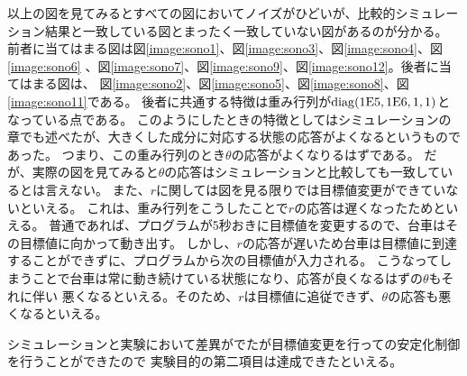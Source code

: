	以上の図を見てみるとすべての図においてノイズがひどいが、比較的シミュレーション結果と一致している図とまったく一致していない図があるのが分かる。
	前者に当てはまる図は図\ref{image:sono1}、図\ref{image:sono3}、図\ref{image:sono4}、図\ref{image:sono6}
	、図\ref{image:sono7}、図\ref{image:sono9}、図\ref{image:sono12}。後者に当てはまる図は、
	図\ref{image:sono2}、図\ref{image:sono5}、図\ref{image:sono8}、図\ref{image:sono11}である。
	後者に共通する特徴は重み行列が$\rm{diag}(1E5,1E6,1,1)$となっている点である。
	このようにしたときの特徴としてはシミュレーションの章でも述べたが、大きくした成分に対応する状態の応答がよくなるというものであった。
	つまり、この重み行列のとき$\theta$の応答がよくなりるはずである。
	だが、実際の図を見てみると$\theta$の応答はシミュレーションと比較しても一致しているとは言えない。
	また、$r$に関しては図を見る限りでは目標値変更ができていないといえる。
	これは、重み行列をこうしたことで$r$の応答は遅くなったためといえる。
	普通であれば、プログラムが5秒おきに目標値を変更するので、台車はその目標値に向かって動き出す。
	しかし、$r$の応答が遅いため台車は目標値に到達することができずに、プログラムから次の目標値が入力される。
	こうなってしまうことで台車は常に動き続けている状態になり、応答が良くなるはずの$\theta$もそれに伴い
	悪くなるといえる。そのため、$r$は目標値に追従できず、$\theta$の応答も悪くなるといえる。
	\par
	シミュレーションと実験において差異がでたが目標値変更を行っての安定化制御を行うことができたので
	実験目的の第二項目は達成できたといえる。
	
	

\newpage
